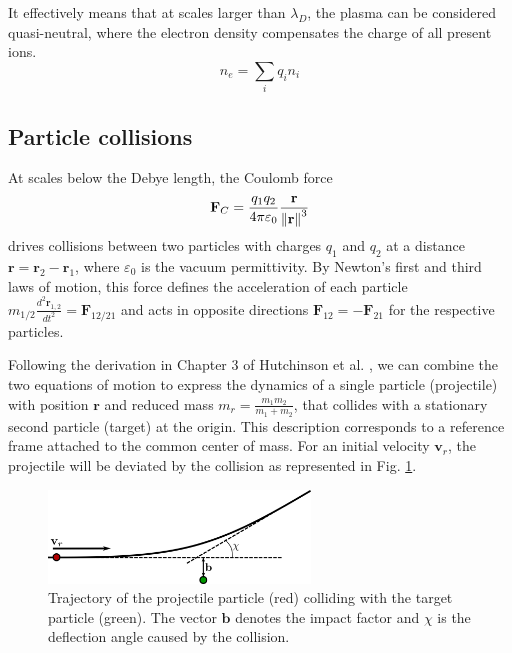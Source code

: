 It effectively means that at scales larger than $\lambda_D$, the plasma can be considered quasi-neutral, where the electron density compensates the charge of all present ions.
\begin{equation}
	\label{eq:1_quasiNeutrality}
	n_e = \sum_{i}q_in_i
\end{equation}



\subsection{Particle collisions}
\label{sec:intro_collisions}

At scales below the Debye length, the Coulomb force
\begin{equation}
	\mathbf{F}_C = \frac{q_1q_2}{4\pi\varepsilon_0}\frac{\mathbf{r}}{\norm{\mathbf{r}}^3}
	\label{eq:1_CoulombForce}
\end{equation}
drives collisions between two particles with charges \( q_1 \) and \( q_2 \) at a distance \( \mathbf{r} = \mathbf{r}_2 - \mathbf{r}_1 \), where \( \varepsilon_0 \) is the vacuum permittivity. By Newton's first and third laws of motion, this force defines the acceleration of each particle \( m_{1/2}\frac{d^2\mathbf{r}_{1,2}}{dt^2} = \mathbf{F}_{12/21} \) and acts in opposite directions \( \mathbf{F}_{12} = -\mathbf{F}_{21} \) for the respective particles.


Following the derivation in Chapter 3 of Hutchinson et al. \cite{hutchinson2001introduction}, we can combine the two equations of motion to express the dynamics of a single particle (projectile) with position \( \mathbf{r} \) and reduced mass \( m_r = \frac{m_1m_2}{m_1 + m_2} \), that collides with a stationary second particle (target) at the origin. This description corresponds to a reference frame attached to the common center of mass. For an initial velocity \( \mathbf{v}_r \), the projectile will be deviated by the collision as represented in Fig. \ref{fig:TokamakBasics_collision}.

\begin{figure}[H]
	\centering
	\includegraphics[width=0.62\textwidth]{schemes/collision.png}
	\caption{Trajectory of the projectile particle (red) colliding with the target particle (green). The vector \( \mathbf{b} \) denotes the impact factor and \( \chi \) is the deflection angle caused by the collision.}
	\label{fig:TokamakBasics_collision}
\end{figure}

